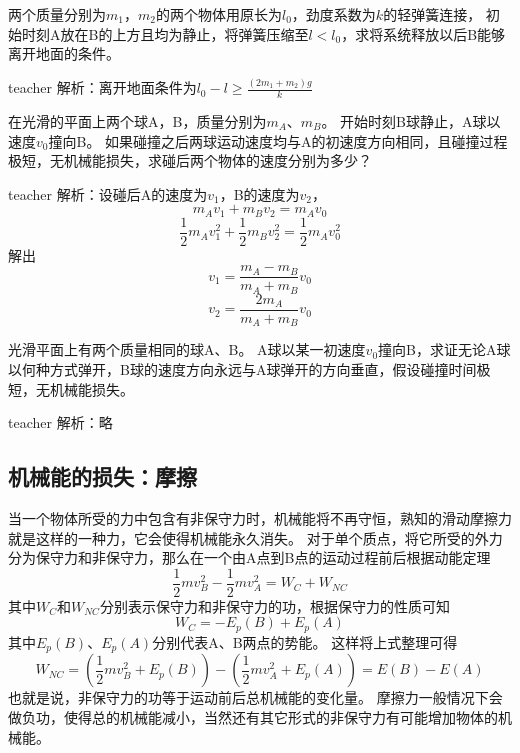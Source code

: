 \begin{example}
两个质量分别为$m_1$，$m_2$的两个物体用原长为$l_0$，劲度系数为$k$的轻弹簧连接，
初始时刻A放在B的上方且均为静止，将弹簧压缩至$l<l_0$，求将系统释放以后B能够离开地面的条件。
	\begin{taggedblock}{teacher}
		\newline
		解析：离开地面条件为$l_0-l\geq\frac{(2m_1+m_2)g}{k}$
	\end{taggedblock}
\end{example}

\begin{example}
在光滑的平面上两个球A，B，质量分别为$m_A$、$m_B$。
开始时刻B球静止，A球以速度$v_0$撞向B。
如果碰撞之后两球运动速度均与A的初速度方向相同，且碰撞过程极短，无机械能损失，求碰后两个物体的速度分别为多少？
	\begin{taggedblock}{teacher}
		\newline
		解析：设碰后A的速度为$v_1$，B的速度为$v_2$，
		\[m_Av_1+m_Bv_2=m_Av_0\]
		\[\frac{1}{2}m_Av_1^2+\frac{1}{2}m_Bv_2^2=\frac{1}{2}m_Av_0^2\]
		解出\[v_1=\frac{m_A-m_B}{m_A+m_B}v_0\]\[v_2=\frac{2m_A}{m_A+m_B}v_0\]
	\end{taggedblock}
\end{example}


\begin{example}
光滑平面上有两个质量相同的球A、B。
A球以某一初速度$v_0$撞向B，求证无论A球以何种方式弹开，B球的速度方向永远与A球弹开的方向垂直，假设碰撞时间极短，无机械能损失。
	\begin{taggedblock}{teacher}
		\newline
		解析：略
	\end{taggedblock}
\end{example}





\subsection{机械能的损失：摩擦}
当一个物体所受的力中包含有非保守力时，机械能将不再守恒，熟知的滑动摩擦力就是这样的一种力，它会使得机械能永久消失。
对于单个质点，将它所受的外力分为保守力和非保守力，那么在一个由A点到B点的运动过程前后根据动能定理
\begin{equation}
\frac{1}{2}mv_B^2-\frac{1}{2}mv_A^2 = W_C+W_{NC}
\end{equation}
其中$W_C$和$W_{NC}$分别表示保守力和非保守力的功，根据保守力的性质可知
\begin{equation}
W_C =  -E_p(B)+E_p(A)
\end{equation}
其中$E_p(B)$、$E_p(A)$分别代表A、B两点的势能。
这样将上式整理可得
\begin{equation}\label{eqn: energy非保守力的能量定理}
W_{NC} = \left(\frac{1}{2}mv_B^2+E_p(B)\right)-\left(\frac{1}{2}mv_A^2+E_p(A)\right) = E(B)-E(A)
\end{equation}
也就是说，非保守力的功等于运动前后总机械能的变化量。
摩擦力一般情况下会做负功，使得总的机械能减小，当然还有其它形式的非保守力有可能增加物体的机械能。

